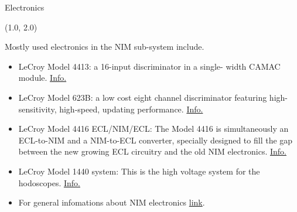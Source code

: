 \documentclass[10pt, xcolor={dvipsnames}, aspectratio = 169, sans,mathserif]{beamer}
\begin{document}
\begin{frame}[fragile]{Electronics}

\begin{textblock}{14.0}(1.0, 2.0)

Mostly used electronics in the NIM sub-system include.

\begin{itemize}

    \item LeCroy Model 4413: a 16-input discriminator in a single- width CAMAC module. \href{https://hallcweb.jlab.org/experiments/hks/datasheets/4413-spec.htm}{Info.}

    \item LeCroy Model 623B: a low cost eight channel discriminator featuring high-sensitivity, high-speed, updating performance. \href{https://www.fnal.gov/projects/ckm/jlab/623b-spec.htm}{Info.}

    \item LeCroy Model 4416 ECL/NIM/ECL: The Model 4416 is simultaneously an ECL-to-NIM and a NIM-to-ECL converter, specially designed to fill the gap between the new growing ECL circuitry and the old NIM electronics. \href{https://www.fnal.gov/projects/ckm/jlab/4616-spec.htm}{Info.}

    \item LeCroy Model 1440 system: This is the high voltage system for the hodoscopes. \href{https://teledynelecroy.com/lrs/dsheets/dslib.htm}{Info.}

    \item For general infomations about NIM electronics \href{https://teledynelecroy.com/lrs/dsheets/dslib.htm}{link}.

\end{itemize}

\end{textblock}

\end{frame}
\end{document}

